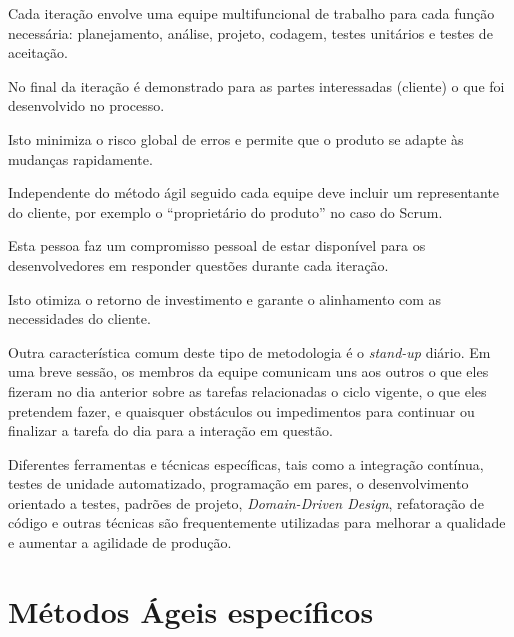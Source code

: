 \par Cada iteração envolve uma equipe multifuncional de trabalho para cada função necessária: planejamento, análise, projeto, codagem, testes unitários e testes de aceitação.
\par No final da iteração é demonstrado para as partes interessadas (cliente) o que foi desenvolvido no processo.
\par Isto minimiza o risco global de erros e permite que o produto se adapte às mudanças rapidamente.
\par Independente do método ágil seguido cada equipe deve incluir um representante do cliente, por exemplo o ``proprietário do produto'' no caso do Scrum.
\par Esta pessoa faz um compromisso pessoal de estar disponível para os desenvolvedores em responder questões durante cada iteração.
\par Isto otimiza o retorno de investimento e garante o alinhamento com as necessidades do cliente.
\par Outra característica comum deste tipo de metodologia é o \emph{stand-up} diário. Em uma breve sessão, os membros da equipe comunicam uns aos outros o que eles fizeram no dia anterior sobre as tarefas relacionadas o ciclo vigente, o que eles pretendem fazer, e quaisquer obstáculos ou impedimentos para continuar ou finalizar a tarefa do dia para a interação em questão.
\par Diferentes ferramentas e técnicas específicas, tais como a integração contínua, testes de unidade automatizado, programação em pares, o desenvolvimento orientado a testes, padrões de projeto, \emph{Domain-Driven Design}, refatoração de código e outras técnicas são frequentemente utilizadas para melhorar a qualidade e aumentar a agilidade de produção.

\section{Métodos Ágeis específicos}
